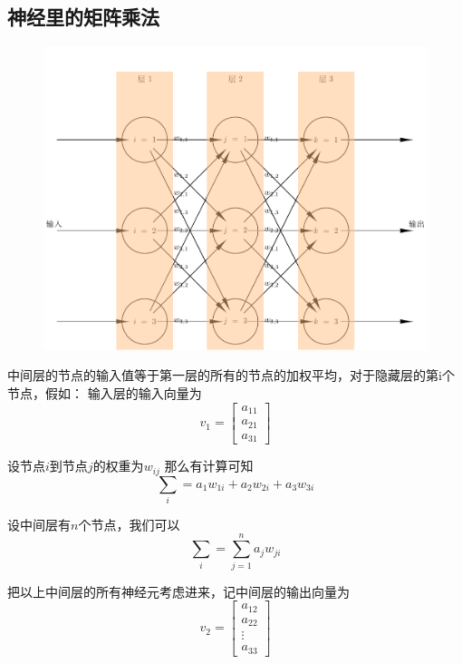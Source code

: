 \documentclass[12pt]{article}
\begin{document}
    \subsection{神经里的矩阵乘法}
    \begin{figure}[!htb]
        \centering
        \includegraphics[scale=0.5]{./picture/MatrixProd.pdf}
    \end{figure}
    中间层的节点的输入值等于第一层的所有的节点的加权平均，对于隐藏层的第i个节点，假如：
    输入层的输入向量为
    \[
        v_1=
        \begin{bmatrix}
        a_11\\
        a_21\\
        a_31 
        \end{bmatrix}
    \]

    设节点$i$到节点$j$的权重为$w_{ij}$
    那么有计算可知
    \begin{equation}
        \sum_i=a_1w_{1i}+a_2w_{2i}+a_3w_{3i}
    \end{equation} 

    设中间层有$n$个节点，我们可以
    \begin{equation}
        \sum_{i}=\sum_{j=1}^{n}{a_jw_{ji}}    
    \end{equation}

    把以上中间层的所有神经元考虑进来，记中间层的输出向量为
    $$
    v_2=
    \begin{bmatrix}
        a_{12}\\
        a_{22}\\
        \vdots\\
        a_{33} 
    \end{bmatrix}
    $$
\end{document}
